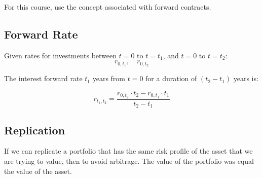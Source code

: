 \begin{warning}
    For this course, use the concept associated with forward contracts.
\end{warning}

\subsection{Forward Rate}
\begin{definition}
    Given rates for investments between $t=0$ to $t=t_1$, and $t=0$ to $t=t_2$:
    \[
    r_{0,t_1}, \quad r_{0,t_2}
    \]

    \noindent The interest forward rate $t_1$ years from $t=0$ for a duration of $(t_2 - t_1)$ years is:
    
    \begin{equation}
        r_{t_1,t_2} = \frac{r_{0,t_2} \cdot t_2 - r_{0,t_1} \cdot t_1}{t_2 - t_1}
    \end{equation}            
\end{definition}

\begin{derivation}
\end{derivation}

\begin{example}
\end{example}

\subsection{Replication}
\begin{intuition}
    If we can replicate a portfolio that has the same risk profile of the asset that we are trying to value, then to avoid arbitrage. The value of the portfolio was equal the value of the asset.    
\end{intuition}

